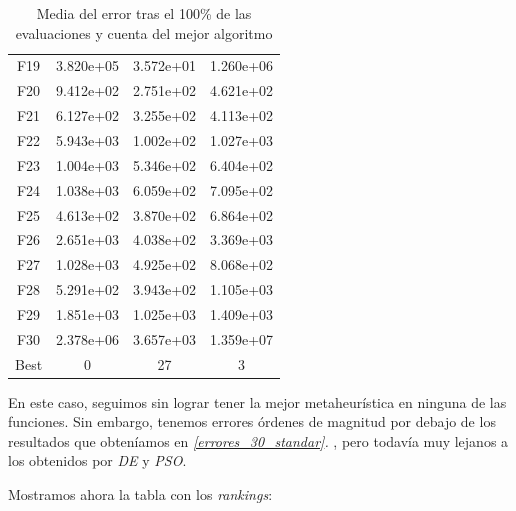 \documentclass[11pt]{article}
\begin{document}
\begin{table}[H]
\begin{tabular}{|c|c|c|c|}
F19  &     3.820e+05 &  3.572e+01 &  1.260e+06 \\
F20  &     9.412e+02 &  2.751e+02 &  4.621e+02 \\
F21  &     6.127e+02 &  3.255e+02 &  4.113e+02 \\
F22  &     5.943e+03 &  1.002e+02 &  1.027e+03 \\
F23  &     1.004e+03 &  5.346e+02 &  6.404e+02 \\
F24  &     1.038e+03 &  6.059e+02 &  7.095e+02 \\
F25  &     4.613e+02 &  3.870e+02 &  6.864e+02 \\
F26  &     2.651e+03 &  4.038e+02 &  3.369e+03 \\
F27  &     1.028e+03 &  4.925e+02 &  8.068e+02 \\
F28  &     5.291e+02 &  3.943e+02 &  1.105e+03 \\
F29  &     1.851e+03 &  1.025e+03 &  1.409e+03 \\
F30  &     2.378e+06 &  3.657e+03 &  1.359e+07 \\
Best &             0 &         27 &          3 \\
\hline
\end{tabular}
    \caption{Media del error tras el 100\% de las evaluaciones y cuenta del mejor algoritmo}
\end{table}

En este caso, seguimos sin lograr tener la mejor metaheurística en ninguna de las funciones. Sin embargo, tenemos errores órdenes de magnitud por debajo de los resultados que obteníamos en \emph{\ref{errores_30_standar}. }, pero todavía muy lejanos a los obtenidos por \emph{DE} y \emph{PSO}.

Mostramos ahora la tabla con los \emph{rankings}:
\end{document}
